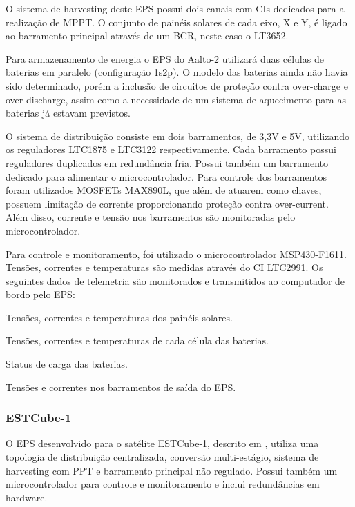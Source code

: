 O sistema de harvesting deste \gls{EPS} possui dois canais com CIs dedicados para a realização de \gls{MPPT}. O conjunto de painéis solares de cada eixo, X e Y, é ligado ao barramento principal através de um \gls{BCR}, neste caso o LT3652.

Para armazenamento de energia o EPS do Aalto-2 utilizará duas células de baterias em paralelo (configuração 1s2p). O modelo das baterias ainda não havia sido determinado, porém a inclusão de circuitos de proteção contra over-charge e over-discharge, assim como a necessidade de um sistema de aquecimento para as baterias já estavam previstos.

O sistema de distribuição consiste em dois barramentos, de 3,3V e 5V, utilizando os reguladores LTC1875 e LTC3122 respectivamente.
Cada barramento possui reguladores duplicados em redundância fria.
Possui também um barramento dedicado para alimentar o microcontrolador.
Para controle dos barramentos foram utilizados MOSFETs MAX890L, que além de atuarem como chaves, possuem limitação de corrente proporcionando proteção contra over-current.
Além disso, corrente e tensão nos barramentos são monitoradas pelo microcontrolador.

Para controle e monitoramento, foi utilizado o microcontrolador MSP430-F1611. Tensões, correntes e temperaturas são medidas através do CI LTC2991. Os seguintes dados de telemetria são monitorados e transmitidos ao computador de bordo pelo EPS:
\begin{alineas}
    \item Tensões, correntes e temperaturas dos painéis solares.
    \item Tensões, correntes e temperaturas de cada célula das baterias.
    \item Status de carga das baterias.
    \item Tensões e correntes nos barramentos de saída do EPS.
\end{alineas}


\subsubsection{ESTCube-1}

O \gls{EPS} desenvolvido para o satélite ESTCube-1, descrito em \textcite{estcube-eps}, utiliza uma topologia de distribuição centralizada, conversão multi-estágio, sistema de harvesting com \gls{PPT} e barramento principal não regulado.
Possui também um microcontrolador para controle e monitoramento e inclui redundâncias em hardware.

